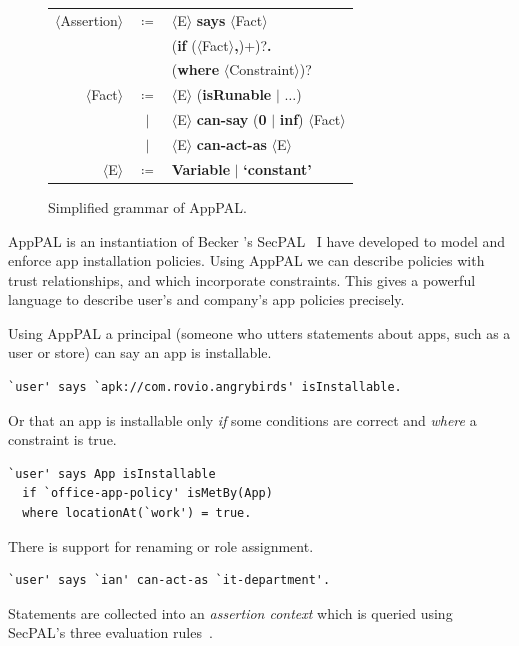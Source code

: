\documentclass[a4paper]{scrartcl}
\begin{document}
\begin{figure}[h]
  \centering
  \newcommand{\nonterminal}[1]{$\langle$#1$\rangle$}
  \newcommand{\terminal}[1]{\textbf{#1}}
  \begin{tabular}{r c l}
    \nonterminal{Assertion} & $\coloneqq$ & \nonterminal{E} \terminal{says} \nonterminal{Fact} \\
                            &             & \hspace{1em}(\terminal{if} (\nonterminal{Fact}\terminal{,})+)?\terminal{.} \\
                            &             & \hspace{1em}(\terminal{where} \nonterminal{Constraint})? \\
    \nonterminal{Fact}      & $\coloneqq$ & \nonterminal{E} (\terminal{isRunable} $\vert$ $\ldots$) \\
                            & $\vert$     & \nonterminal{E} \terminal{can-say} (\terminal{0} $\vert$ \terminal{inf}) \nonterminal{Fact} \\
                            & $\vert$     & \nonterminal{E} \terminal{can-act-as} \nonterminal{E} \\
    \nonterminal{E}         & $\coloneqq$ & \terminal{Variable} $\vert$ \terminal{`constant'}
  \end{tabular}
  \caption{Simplified grammar of AppPAL.}
  \label{fig:grammar}
\end{figure}

AppPAL is an instantiation of Becker \etal's SecPAL~\citep{Becker:2006vh} I have developed to model and enforce app installation policies.
Using AppPAL we can describe policies with trust relationships, and which incorporate constraints.
This gives a powerful language to describe user's and company's app policies precisely.

Using AppPAL a principal (someone who utters statements about apps, such as a user or store) can say an app is installable.
\begin{lstlisting}
`user' says `apk://com.rovio.angrybirds' isInstallable.
\end{lstlisting}
Or that an app is installable only \emph{if} some conditions are correct and \emph{where} a constraint is true.
\begin{lstlisting}
`user' says App isInstallable
  if `office-app-policy' isMetBy(App)
  where locationAt(`work') = true.
\end{lstlisting}
There is support for renaming or role assignment.
\begin{lstlisting}
`user' says `ian' can-act-as `it-department'.
\end{lstlisting}
Statements are collected into an \emph{assertion context} which is queried using SecPAL's three evaluation rules~\citep{Becker:2006vh}.
\end{document}
